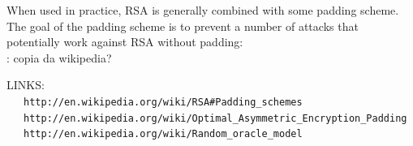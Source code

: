 \documentclass[pdflatex,11pt,a4paper,oneside]{article}
\let\OldEmph\emph
\renewcommand{\emph}[1]{\OldEmph{#1\/}}
\newcommand{\XXX}[1][XXX]{\text{\bfseries{\color{red}{\emph{#1}}}}}
\newcommand{\TODO}[0]{\XXX[TODO]}
\begin{document}
When used in practice, RSA is generally combined with some padding scheme.
The goal of the padding scheme is to prevent a number of attacks that
potentially work against RSA without padding:\\
\TODO: copia da wikipedia?

LINKS:\\
~~~\verb+http://en.wikipedia.org/wiki/RSA#Padding_schemes+\\
~~~\verb+http://en.wikipedia.org/wiki/Optimal_Asymmetric_Encryption_Padding+
~~~\verb+http://en.wikipedia.org/wiki/Random_oracle_model+

\end{document}
